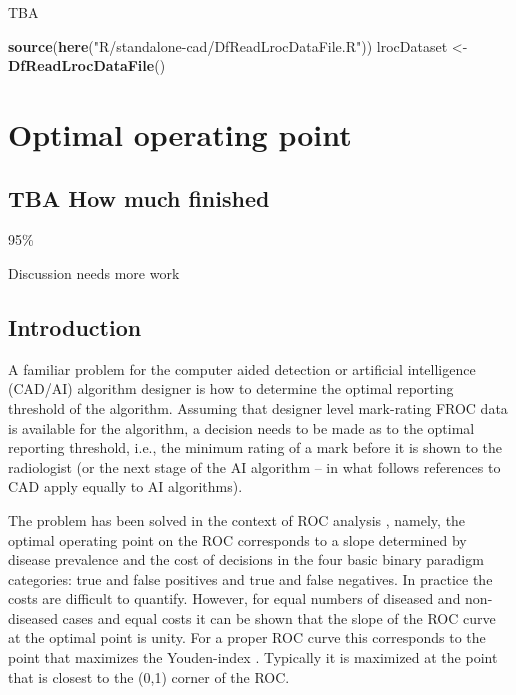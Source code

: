 \documentclass[
]{book}
\newenvironment{Shaded}{\begin{snugshade}}{\end{snugshade}}
\newcommand{\KeywordTok}[1]{\textcolor[rgb]{0.13,0.29,0.53}{\textbf{#1}}}
\newcommand{\NormalTok}[1]{#1}
\newcommand{\StringTok}[1]{\textcolor[rgb]{0.31,0.60,0.02}{#1}}
\begin{document}
TBA

\begin{Shaded}
\begin{Highlighting}[]
\KeywordTok{source}\NormalTok{(}\KeywordTok{here}\NormalTok{(}\StringTok{"R/standalone-cad/DfReadLrocDataFile.R"}\NormalTok{))}
\NormalTok{lrocDataset <-}\StringTok{ }\KeywordTok{DfReadLrocDataFile}\NormalTok{()}
\end{Highlighting}
\end{Shaded}

\hypertarget{optim-op-point}{%
\chapter{Optimal operating point}\label{optim-op-point}}

\hypertarget{optim-op-point-how-much-finished}{%
\section{TBA How much finished}\label{optim-op-point-how-much-finished}}

95\%

Discussion needs more work

\hypertarget{optim-op-point-intro}{%
\section{Introduction}\label{optim-op-point-intro}}

A familiar problem for the computer aided detection or artificial intelligence (CAD/AI) algorithm designer is how to determine the optimal reporting threshold of the algorithm. Assuming that designer level mark-rating FROC data is available for the algorithm, a decision needs to be made as to the optimal reporting threshold, i.e., the minimum rating of a mark before it is shown to the radiologist (or the next stage of the AI algorithm -- in what follows references to CAD apply equally to AI algorithms).

The problem has been solved in the context of ROC analysis \citep{metz1978rocmethodology}, namely, the optimal operating point on the ROC corresponds to a slope determined by disease prevalence and the cost of decisions in the four basic binary paradigm categories: true and false positives and true and false negatives. In practice the costs are difficult to quantify. However, for equal numbers of diseased and non-diseased cases and equal costs it can be shown that the slope of the ROC curve at the optimal point is unity. For a proper ROC curve this corresponds to the point that maximizes the Youden-index \citep{youden1950index}. Typically it is maximized at the point that is closest to the (0,1) corner of the ROC.
\end{document}
